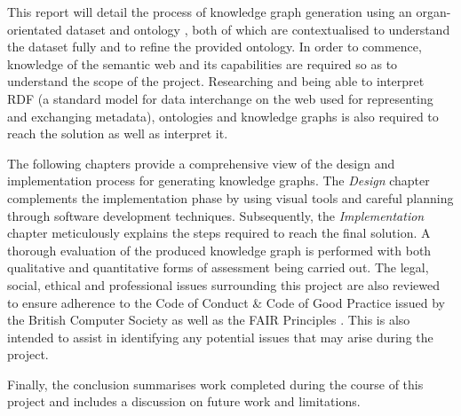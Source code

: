 This report will detail the process of knowledge graph generation using an organ-orientated dataset and ontology \cite{organontology}, both of which are contextualised to understand the dataset fully and to refine the provided ontology. In order to commence, knowledge of the semantic web and its capabilities are required so as to understand the scope of the project. Researching and being able to interpret RDF (a standard model for data interchange on the web \cite{gottschalk2021creation} used for representing and exchanging metadata), ontologies and knowledge graphs is also required to reach the solution as well as interpret it. 

The following chapters provide a comprehensive view of the design and implementation process for generating knowledge graphs. The \textit{Design} chapter complements the implementation phase by using visual tools and careful planning through software development techniques. Subsequently, the \textit{Implementation} chapter meticulously explains the steps required to reach the final solution. A thorough evaluation of the produced knowledge graph is performed with both qualitative and quantitative forms of assessment being carried out. The legal, social, ethical and professional issues surrounding this project are also reviewed to ensure adherence to the Code of Conduct \& Code of Good Practice issued by the British Computer Society \cite{bcs} as well as the FAIR Principles \cite{fairprinciples}. This is also intended to assist in identifying any potential issues that may arise during the project.

Finally, the conclusion summarises work completed during the course of this project and includes a discussion on future work and limitations. 
